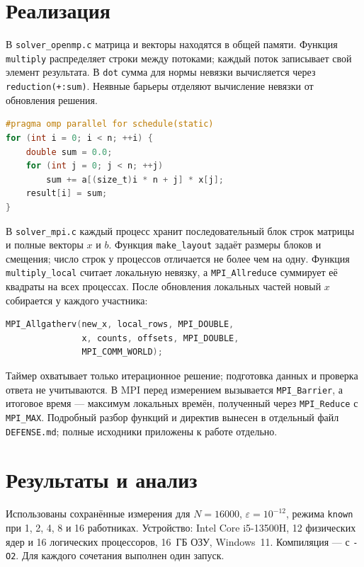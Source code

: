 \documentclass[a4paper,14pt]{extarticle}
\begin{document}
\section{Реализация}
В \texttt{solver\_openmp.c} матрица и векторы находятся в общей памяти.
Функция \texttt{multiply} распределяет строки между потоками;
каждый поток записывает свой элемент результата. В \texttt{dot}
сумма для нормы невязки вычисляется через \texttt{reduction(+:sum)}.
Неявные барьеры отделяют вычисление невязки от обновления решения.

\begin{lstlisting}[language=C,caption={Распределение строк в OpenMP}]
#pragma omp parallel for schedule(static)
for (int i = 0; i < n; ++i) {
    double sum = 0.0;
    for (int j = 0; j < n; ++j)
        sum += a[(size_t)i * n + j] * x[j];
    result[i] = sum;
}
\end{lstlisting}

В \texttt{solver\_mpi.c} каждый процесс хранит последовательный блок строк
матрицы и полные векторы $x$ и $b$. Функция \texttt{make\_layout} задаёт
размеры блоков и смещения; число строк у процессов отличается не более
чем на одну. Функция \texttt{multiply\_local} считает локальную невязку,
а \texttt{MPI\_Allreduce} суммирует её квадраты на всех процессах.
После обновления локальных частей новый $x$ собирается у каждого участника:

\begin{lstlisting}[language=C,caption={Сборка полного вектора в MPI}]
MPI_Allgatherv(new_x, local_rows, MPI_DOUBLE,
               x, counts, offsets, MPI_DOUBLE,
               MPI_COMM_WORLD);
\end{lstlisting}

Таймер охватывает только итерационное решение; подготовка данных и проверка
ответа не учитываются. В MPI перед измерением вызывается
\texttt{MPI\_Barrier}, а итоговое время --- максимум локальных времён,
полученный через \texttt{MPI\_Reduce} с \texttt{MPI\_MAX}.
Подробный разбор функций и директив вынесен в отдельный файл
\texttt{DEFENSE.md}; полные исходники приложены к работе отдельно.

\section{Результаты и анализ}
Использованы сохранённые измерения для $N=16000$, $\varepsilon=10^{-12}$,
режима \texttt{known} при 1, 2, 4, 8 и 16 работниках.
Устройство: Intel Core i5-13500H, 12 физических ядер и 16 логических
процессоров, 16~ГБ ОЗУ, Windows~11. Компиляция --- с \texttt{-O2}.
Для каждого сочетания выполнен один запуск.
\end{document}
